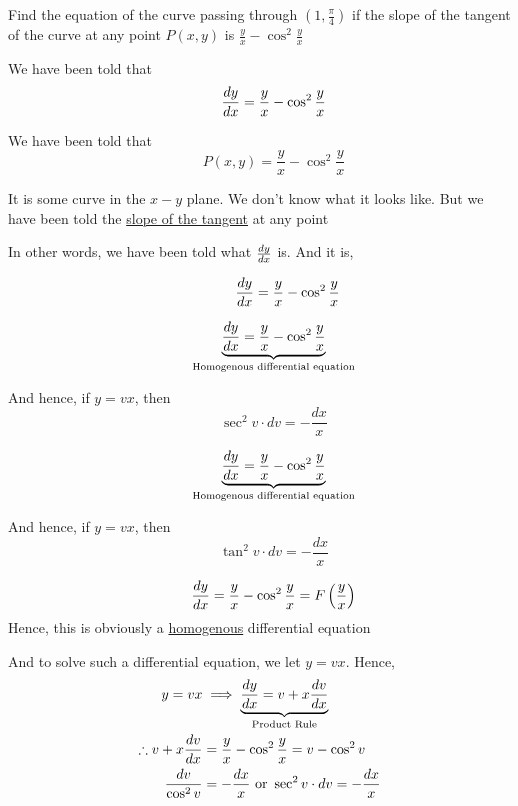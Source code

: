 \documentclass[14pt,fleqn]{extarticle}
\newcommand\pt{\left(1,\frac\pi{4} \right)}
\newcommand\yx{\frac{y}{x}}
\newcommand\dvdx{\frac{dv}{dx}}
\begin{document}
 
\begin{problem}
	\statement 
    
    Find the equation of the curve passing through $\pt$ if the slope of the
    tangent of the curve at any point $P(x,y)$ is $\yx -\cos^2\yx$ 
    
    \begin{step}
  \begin{options} 
     \correct 
       
       We have been told that 
       \[ \qquad \dydx = \yx - \cos^2 \yx \]
     \incorrect
        
       We have been told that 
       \[ \qquad P(x,y) = \yx - \cos^2\yx \] 
    \end{options} 
     \reason 
     
     It is some curve in the $x-y$ plane. We don't know what it looks like. But we have been told the \underline{slope of the tangent} at any point\newline 
     
     In other words, we have been told what $\frac{dy}{dx}$ is. And it is, 
     
     \[ \qquad\qquad  \dydx = \yx - \cos^2\yx \]
       
\end{step}

\begin{step}
  \begin{options} 
     \correct 
      
      \[ \qquad \underbrace{\dydx = \yx - \cos^2\yx}_{\text{Homogenous differential equation}}\]
      
      And hence, if $ y = vx$, then 
      \[ \qquad \sec^2 v \cdot dv = -\frac{dx}{x} \]
     \incorrect
     
      \[ \qquad \underbrace{\dydx = \yx - \cos^2\yx}_{\text{Homogenous differential equation}}\]
      
      And hence, if $ y = vx$, then 
      \[ \qquad \tan^2 v \cdot dv = -\frac{dx}{x} \]
        
    \end{options} 
     \reason 
     
     \[ \qquad \dydx = \yx - \cos^2\yx = F \left(\yx \right)\]
     Hence, this is obviously a \underline{homogenous} differential equation \newline 
     
     And to solve such a differential equation, we let $y = vx$. Hence, 
     \begin{align}
     y = vx &\implies \underbrace{\dydx = v + x\dvdx}_{\text{Product Rule}} \\
     \therefore v + x\dvdx &= \yx - \cos^2\yx = v - \cos^2 v \\
     \frac{dv}{\cos^2 v} &= -\frac{dx}{x} \text{ or } \sec^2 v\cdot dv = -\frac{dx}{x}
\end{align}
       

\end{step}
\end{problem}
\end{document}
